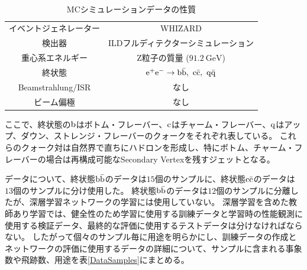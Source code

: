 \begin{table}[htb]
 \centering
　\small
  \begin{tabular}{c c} \hline
    イベントジェネレーター & WHIZARD\\
    検出器 & ILDフルディテクターシミュレーション\\
    重心系エネルギー & Z粒子の質量 ($91.2\ \mathrm{GeV}$)\\ 
    終状態 & $\rm e^+ e^- \to b\bar{b},\  c\bar{c},\  q\bar{q}$\\ 
    Beamstrahlung/ISR & なし\\
    ビーム偏極 & なし\\\hline
  \end{tabular}
  \caption{MCシミュレーションデータの性質}
  \label{MCSimulationDataProperty}
\end{table}

ここで、終状態の$\rm b$はボトム・フレーバー、$\rm c$はチャーム・フレーバー、$\rm q$はアップ、ダウン、ストレンジ・フレーバーのクォークをそれぞれ表している。
これらのクォーク対は自然界で直ちにハドロンを形成し、特にボトム、チャーム・フレーバーの場合は再構成可能なSecondary Vertexを残すジェットとなる。

データについて、終状態$\rm b\bar{b}$のデータは$15$個のサンプルに、終状態$\rm c\bar{c}$のデータは$13$個のサンプルに分け使用した。
終状態$\rm b\bar{b}$のデータは$12$個のサンプルに分離したが、深層学習ネットワークの学習には使用していない。
深層学習を含めた教師あり学習では、健全性のため学習に使用する訓練データと学習時の性能観測に使用する検証データ、最終的な評価に使用するテストデータは分けなければならない。
したがって個々のサンプル毎に用途を明らかにし、訓練データの作成とネットワークの評価に使用するデータの詳細について、サンプルに含まれる事象数や飛跡数、用途を表\ref{DataSamples}にまとめる。

